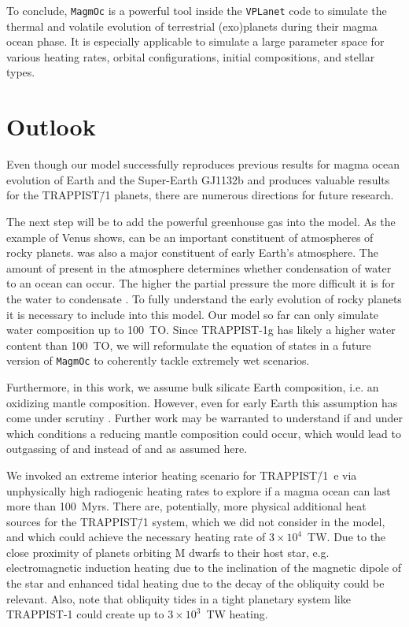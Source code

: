 \documentclass[paper=letterpaper,fontsize=12pt,oneside,twocolumn]{article}
\newcommand{\vplanet}{\texttt{\footnotesize{VPLanet}}}
\newcommand{\magmoc}{\texttt{\footnotesize{MagmOc}}}
\newcommand{\eg}{e.g. }
\begin{document}
To conclude, \magmoc{} is a powerful tool inside the \vplanet{} code to simulate the thermal and volatile evolution of terrestrial (exo)planets during their magma ocean phase.
It is especially applicable to simulate a large parameter space for various heating rates, orbital configurations, initial compositions, and stellar types.

\section{Outlook}
\label{sec: outlook}

Even though our model successfully reproduces previous results for magma ocean evolution of Earth and the Super-Earth GJ1132b \citep{Elkins-Tanton2008,Hamano2013,Schaefer2016} and produces valuable results for the TRAPPIST\=/1 planets, there are numerous directions for future research.

The next step will be to add the powerful greenhouse gas  into the model. As the example of Venus shows,  can be an important constituent of atmospheres of rocky planets. 
 was also a major constituent of early Earth's atmosphere.
The amount of  present in the atmosphere determines whether condensation of water to an ocean can occur. 
The higher the  partial pressure the more difficult it is for the water to condensate \citep{Lebrun2013,Massol2016,Salvador2017,Stueken2020}.
To fully understand the early evolution of rocky planets it is necessary to include  into this model.
Our model so far can only simulate water composition up to 100~TO. Since TRAPPIST-1g has likely a higher water content than 100~TO, we will reformulate the equation of states in a future version of \magmoc{} to coherently tackle extremely wet scenarios.

Furthermore, in this work, we assume bulk silicate Earth composition, i.e. an oxidizing mantle composition. However, even for early Earth this assumption has come under scrutiny \citep{Kasting1993b,Gaillard2014,Ehlmann2016,Fegley2016,Schaefer2016,DelGenio2018,Armstrong2019}. Further work may be warranted to understand if and under which conditions a reducing mantle composition could occur, which would lead to outgassing of  and  instead of  and  as assumed here.

We invoked an extreme interior heating scenario for TRAPPIST\=/1~e via unphysically high radiogenic heating rates to explore if a magma ocean can last more than 100~Myrs.  There are, potentially, more physical additional heat sources for the TRAPPIST\=/1 system, which we did not consider in the model, and which could achieve the necessary heating rate of $3\times 10^4$~TW. Due to the close proximity of planets orbiting M dwarfs to their host star, \eg electromagnetic induction heating due to the inclination of the magnetic dipole of the star \citep{Kislyakova2017} and enhanced tidal heating due to the decay of the obliquity \citep{Heller2011} could be relevant.  Also, \citet{Millholland2019} note that obliquity tides in a tight planetary system like TRAPPIST-1 could create up to $3 \times 10^3$~TW heating.
\end{document}
